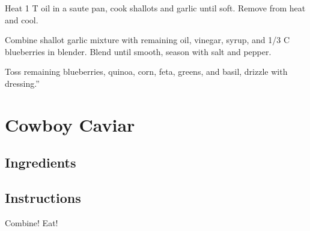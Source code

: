 \documentclass[ansiapaper,10pt,english]{sphinxmanual}
\begin{document}
Heat 1 T oil in a saute pan, cook shallots and garlic until soft. Remove from heat and cool.

Combine shallot garlic mixture with remaining oil, vinegar, syrup, and 1/3 C blueberries in blender. Blend until smooth, season with salt and pepper.

Toss remaining blueberries, quinoa, corn, feta, greens, and basil, drizzle with dressing.”


\chapter{Cowboy Caviar}
\label{\detokenize{Cowboy_Caviar:cowboy-caviar}}\label{\detokenize{Cowboy_Caviar::doc}}

\section{Ingredients}
\label{\detokenize{Cowboy_Caviar:ingredients}}
%
\begin{sphinxVerbatim}[commandchars=\\\{\}]
       

   

   

    

   

   

    

  

   

    
\end{sphinxVerbatim}


\section{Instructions}
\label{\detokenize{Cowboy_Caviar:instructions}}
Combine! Eat!
\end{document}
